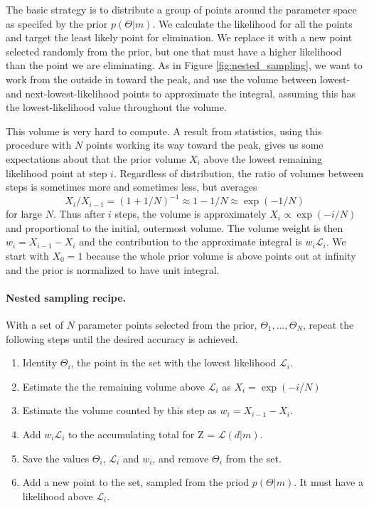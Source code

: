 The basic strategy is to distribute a group of points around the parameter space as specifed by the prior $p(\Theta | m)$.  We calculate the likelihood for all the points and target the least likely point for elimination.  We replace it with a new point selected randomly from the prior, but one that must have a higher likelihood than the point we are eliminating.  As in Figure \ref{fig:nested_sampling}, we want to work from the outside in toward the peak, and use the volume between lowest- and next-lowest-likelihood points to approximate the integral, assuming this has the lowest-likelihood value throughout the volume.

This volume is very hard to compute.  A result from statistics, using this procedure with $N$ points working its way toward the peak,  gives us some expectations about that the prior volume $X_i$ above the lowest remaining likelihood point at step $i$.  Regardless of distribution, the ratio of volumes between steps is sometimes more and sometimes less, but averages \begin{equation}X_i/X_{i-1} = (1+1/N)^{-1} \approx 1-1/N \approx \exp(-1/N)\end{equation} for large $N$.
Thus after $i$ steps, the volume is approximately $X_i \propto \exp(-i/N)$ and proportional to the initial, outermost volume.
The volume weight is then $w_i = X_{i-1} - X_i$ and the contribution to the approximate integral is $w_i \mathcal{L}_i$.  We start with $X_0 = 1$ because the whole prior volume is above points out at infinity and the prior is normalized to have unit integral.

\paragraph{Nested sampling recipe.}  With a set of $N$ parameter points selected from the prior, $\Theta_1, ..., \Theta_N$, repeat the following steps until the desired accuracy is achieved.
\begin{enumerate}
\item Identity $\Theta_i$, the point in the set with the lowest likelihood $\mathcal{L}_i$.
\item Estimate the the remaining volume above  $\mathcal{L}_i$ as $X_i = \exp(-i/N)$
\item Estimate the volume counted by this step as $w_i = X_{i-1} - X_i$.
\item Add $w_i \mathcal{L}_i$ to the accumulating total for Z = $\mathcal{L}(d|m)$.
\item Save the values $\Theta_i$, $\mathcal{L}_i$ and $w_i$, and remove $\Theta_i$ from the set.
\item Add a new point to the set, sampled from the priod $p(\Theta|m)$. It must have a likelihood above $\mathcal{L}_i$.  
\end{enumerate}

